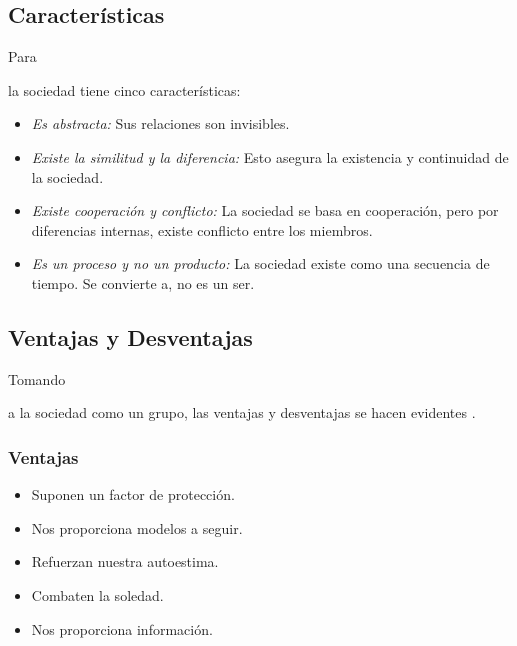 \documentclass[stu, 12pt, letterpaper, donotrepeattitle, floatsintext, natbib]{apa7}
\begin{document}
\subsection{Características}
Para\begin{justifying}
    \cite{husain-no-date} %
    la sociedad tiene cinco características:
    \begin{itemize}
        \item \emph{Es abstracta:} Sus relaciones son invisibles.
        \item \emph{Existe la similitud y la diferencia:} Esto asegura la existencia y continuidad de la sociedad.
        \item \emph{Existe cooperación y conflicto:} La sociedad se basa en cooperación, pero por diferencias internas, existe conflicto entre los miembros.
        \item \emph{Es un proceso y no un producto:} La sociedad existe como una secuencia de tiempo. Se convierte a, no es un ser. 
    \end{itemize}\par
\end{justifying}
\vspace{\baselineskip}
\subsection{Ventajas y Desventajas}
Tomando \begin{justifying}
    a la sociedad como un grupo, las ventajas y desventajas se hacen evidentes \citep{torres-2021}. %
    \par
\end{justifying}
\vspace{\baselineskip}
\subsubsection{Ventajas}
\begin{justifying}
    \begin{itemize}
        \item Suponen un factor de protección.
        \item Nos proporciona modelos a seguir.
        \item Refuerzan nuestra autoestima.
        \item Combaten la soledad.
        \item Nos proporciona información.        
    \end{itemize}\par
\end{justifying}
\vspace{\baselineskip}
\end{document}
